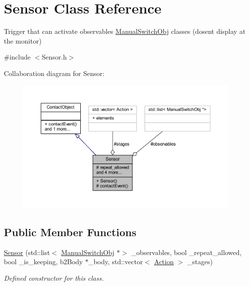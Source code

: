 \hypertarget{class_sensor}{}\section{Sensor Class Reference}
\label{class_sensor}


Trigger that can activate observables \hyperlink{class_manual_switch_obj}{Manual\+Switch\+Obj} classes (dosen\textquotesingle{}t display at the monitor)  




{\ttfamily \#include $<$Sensor.\+h$>$}



Collaboration diagram for Sensor\+:\nopagebreak
\begin{figure}[H]
\begin{center}
\leavevmode
\includegraphics[width=350pt]{class_sensor__coll__graph}
\end{center}
\end{figure}
\subsection*{Public Member Functions}
\begin{DoxyCompactItemize}
\item 
\hyperlink{class_sensor_a7988853c8a9278171ce8956ccdde63c8}{Sensor} (std\+::list$<$ \hyperlink{class_manual_switch_obj}{Manual\+Switch\+Obj} $\ast$$>$ \+\_\+observables, bool \+\_\+repeat\+\_\+allowed, bool \+\_\+is\+\_\+keeping, b2\+Body $\ast$\+\_\+body, std\+::vector$<$ \hyperlink{_manual_switch_obj_8h_a8bb1ef53467e4f61410d12822d922498}{Action} $>$ \+\_\+stages)
\begin{DoxyCompactList}\small\item\em Defined constructor for this class. \end{DoxyCompactList}\end{DoxyCompactItemize}
